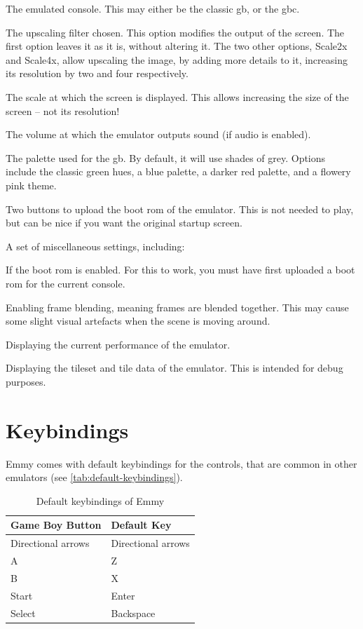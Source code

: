 \begin{compactitem}
	\item The emulated console. This may either be the classic \glsdesc{gb}, or the \glsdesc{gbc}.
	\item The upscaling filter chosen. This option modifies the output of the screen. The first option leaves it as it is, without altering it. The two other options, Scale2x and Scale4x, allow upscaling the image, by adding more details to it, increasing its resolution by two and four respectively.
	\item The scale at which the screen is displayed. This allows increasing the size of the screen -- not its resolution!
	\item The volume at which the emulator outputs sound (if audio is enabled).
	\item The palette used for the \glsdesc{gb}. By default, it will use shades of grey. Options include the classic green hues, a blue palette, a darker red palette, and a flowery pink theme.
	\item Two buttons to upload the boot \gls{rom} of the emulator. This is not needed to play, but can be nice if you want the original startup screen.
	\item A set of miscellaneous settings, including:
	\begin{compactitem}
		\item If the boot \gls{rom} is enabled. For this to work, you must have first uploaded a boot \gls{rom} for the current console.
		\item Enabling frame blending, meaning frames are blended together. This may cause some slight visual artefacts when the scene is moving around.
		\item Displaying the current performance of the emulator.
		\item Displaying the tileset and tile data of the emulator. This is intended for debug purposes.
	\end{compactitem}
\end{compactitem}

\section{Keybindings}

Emmy comes with default keybindings for the controls, that are common in other emulators (see \autoref{tab:default-keybindings}). 

\begin{table}[h]
    \centering
    \begin{tabular}{|l|l|}
    \hline
    \textbf{Game Boy Button} & \textbf{Default Key} \\ \hline
    Directional arrows & Directional arrows \\ \hline
    A & Z \\ \hline
    B & X \\ \hline
    Start & Enter \\ \hline
    Select & Backspace \\ \hline
    \end{tabular}
    \caption{Default keybindings of Emmy}
    \label{tab:default-keybindings}
\end{table}

